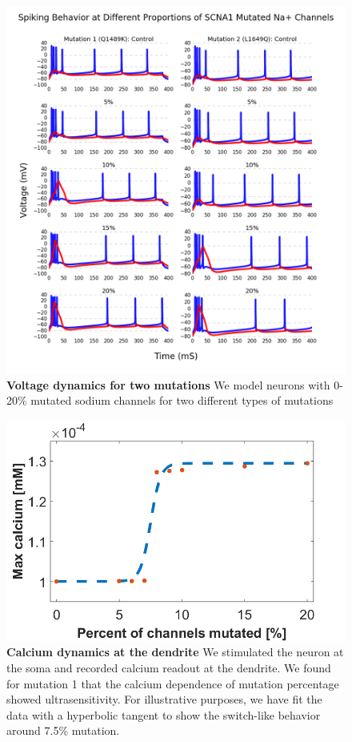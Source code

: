 \begin{figure}[!!h]
    \centering
    \includegraphics[width=1\textwidth]{images/spikes_all.png}
    \caption{\textbf{Voltage dynamics for two mutations} We model neurons with 0-20\% mutated sodium channels for two different types of mutations}
    \label{volt}
\end{figure}

\begin{figure}[!!h]
    \centering
    \includegraphics[width=1\textwidth]{images/ultraGraphSomaStim.png}
    \caption{\textbf{Calcium dynamics at the dendrite} We stimulated the neuron at the soma and recorded calcium readout at the dendrite. We found for mutation 1 that the calcium dependence of mutation percentage showed ultrasensitivity. For illustrative purposes, we have fit the data with a hyperbolic tangent to show the switch-like behavior around 7.5\% mutation.}
    \label{ultra}
\end{figure}

